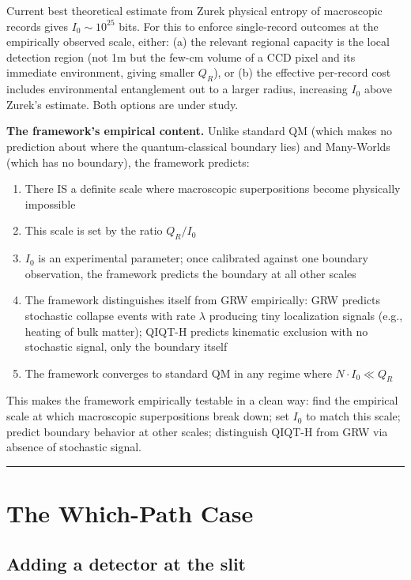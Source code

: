 \documentclass[11pt,a4paper]{article}
\begin{document}
Current best theoretical estimate from Zurek physical entropy of macroscopic records gives $I_0 \sim 10^{25}$ bits. For this to enforce single-record outcomes at the empirically observed scale, either: (a) the relevant regional capacity is the local detection region (not 1m but the few-cm volume of a CCD pixel and its immediate environment, giving smaller $Q_R$), or (b) the effective per-record cost includes environmental entanglement out to a larger radius, increasing $I_0$ above Zurek's estimate. Both options are under study.

\textbf{The framework's empirical content.} Unlike standard QM (which makes no prediction about where the quantum-classical boundary lies) and Many-Worlds (which has no boundary), the framework predicts:
\begin{enumerate}
  \item There IS a definite scale where macroscopic superpositions become physically impossible
  \item This scale is set by the ratio $Q_R/I_0$
  \item $I_0$ is an experimental parameter; once calibrated against one boundary observation, the framework predicts the boundary at all other scales
  \item The framework distinguishes itself from GRW empirically: GRW predicts stochastic collapse events with rate $\lambda$ producing tiny localization signals (e.g., heating of bulk matter); QIQT-H predicts kinematic exclusion with no stochastic signal, only the boundary itself
  \item The framework converges to standard QM in any regime where $N \cdot I_0 \ll Q_R$
\end{enumerate}

This makes the framework empirically testable in a clean way: find the empirical scale at which macroscopic superpositions break down; set $I_0$ to match this scale; predict boundary behavior at other scales; distinguish QIQT-H from GRW via absence of stochastic signal.

\medskip\hrule\medskip

\section{The Which-Path Case}

\subsection{Adding a detector at the slit}
\end{document}
